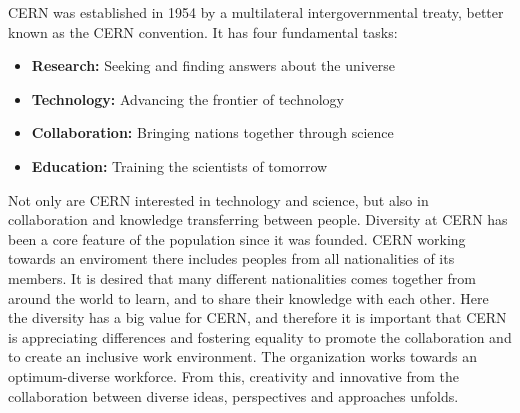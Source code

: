 CERN was established in 1954 by a multilateral intergovernmental treaty, better known as the CERN convention. 
It has four fundamental tasks:

\begin{itemize}
    \item \textbf{Research:} Seeking and finding answers about the universe
    \item \textbf{Technology:} Advancing the frontier of technology  
    \item \textbf{Collaboration:} Bringing nations together through science 
    \item \textbf{Education:} Training the scientists of tomorrow    
\end{itemize}





\noindent Not only are CERN interested in technology and science, but also in collaboration and knowledge transferring between people. 
Diversity at CERN has been a core feature of the population since it was founded. CERN working towards an enviroment there includes peoples from all nationalities of its members. It is desired that many different nationalities comes together from around the world to learn, and to share their knowledge with each other. Here the diversity has a big value for CERN, and therefore it is important that CERN is appreciating differences and fostering equality to promote the collaboration and to create an inclusive work environment. The organization works towards an optimum-diverse workforce. From this, creativity and innovative from the collaboration between diverse ideas, perspectives and approaches unfolds.

